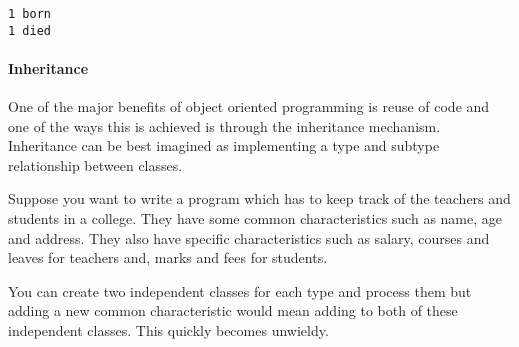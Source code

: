 \documentclass[11pt]{article}
\begin{document}
    \begin{Verbatim}[commandchars=\\\{\}]
1 born
1 died

    \end{Verbatim}

    \paragraph{Inheritance}\label{inheritance}

One of the major benefits of object oriented programming is reuse of
code and one of the ways this is achieved is through the inheritance
mechanism. Inheritance can be best imagined as implementing a type and
subtype relationship between classes.

Suppose you want to write a program which has to keep track of the
teachers and students in a college. They have some common
characteristics such as name, age and address. They also have specific
characteristics such as salary, courses and leaves for teachers and,
marks and fees for students.

You can create two independent classes for each type and process them
but adding a new common characteristic would mean adding to both of
these independent classes. This quickly becomes unwieldy.
\end{document}
